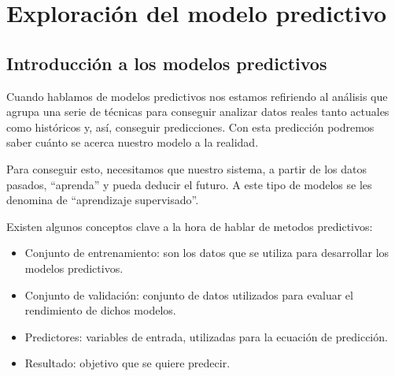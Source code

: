 \cleardoublepage

\chapter{Exploración del modelo predictivo}
\label{makereference5}

\section{Introducción a los modelos predictivos}
\label{makereference5.1}

Cuando hablamos de modelos predictivos nos estamos refiriendo al análisis que agrupa una serie de técnicas para conseguir analizar datos reales tanto actuales como históricos y, así, conseguir predicciones. Con esta predicción podremos saber cuánto se acerca nuestro modelo a la realidad.

Para conseguir esto, necesitamos que nuestro sistema, a partir de los datos pasados, ``aprenda'' y pueda deducir el futuro. A este tipo de modelos se les denomina de ``aprendizaje supervisado''.

Existen algunos conceptos clave a la hora de hablar de metodos predictivos:
\begin{itemize}
	\item Conjunto de entrenamiento: son los datos que se utiliza para desarrollar los modelos predictivos.
	\item Conjunto de validación: conjunto de datos utilizados para evaluar el rendimiento de dichos modelos.
	\item Predictores: variables de entrada, utilizadas para la ecuación de predicción. 
	\item Resultado: objetivo que se quiere predecir.
\end{itemize}

